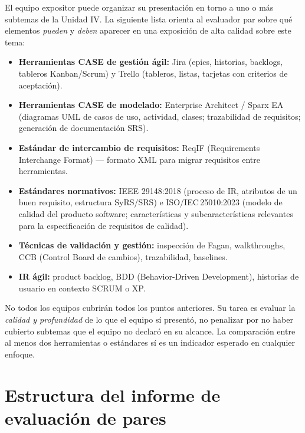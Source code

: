 \documentclass[11pt]{article}
\begin{document}
El equipo expositor puede organizar su presentación en torno a uno o más subtemas de la Unidad IV. La siguiente lista orienta al evaluador par sobre qué elementos \emph{pueden} y \emph{deben} aparecer en una exposición de alta calidad sobre este tema:

\begin{itemize}[leftmargin=16pt,itemsep=3pt]
	\item \textbf{Herramientas CASE de gestión ágil:} Jira (epics, historias, backlogs, tableros Kanban/Scrum) y Trello (tableros, listas, tarjetas con criterios de aceptación).
	\item \textbf{Herramientas CASE de modelado:} Enterprise Architect / Sparx EA (diagramas UML de casos de uso, actividad, clases; trazabilidad de requisitos; generación de documentación SRS).
	\item \textbf{Estándar de intercambio de requisitos:} ReqIF (Requirements Interchange Format) --- formato XML para migrar requisitos entre herramientas.
	\item \textbf{Estándares normativos:} IEEE 29148:2018 (proceso de IR, atributos de un buen requisito, estructura SyRS/SRS) e ISO/IEC\,25010:2023 (modelo de calidad del producto software; características y subcaracterísticas relevantes para la especificación de requisitos de calidad).
	\item \textbf{Técnicas de validación y gestión:} inspección de Fagan, walkthroughs, CCB (Control Board de cambios), trazabilidad, baselines.
	\item \textbf{IR ágil:} product backlog, BDD (Behavior-Driven Development), historias de usuario en contexto SCRUM o XP.
\end{itemize}

\begin{cajaaviso}[title=Para el evaluador par]
	No todos los equipos cubrirán todos los puntos anteriores. Su tarea es evaluar la \emph{calidad y profundidad} de lo que el equipo sí presentó, no penalizar por no haber cubierto subtemas que el equipo no declaró en su alcance. La comparación entre al menos dos herramientas o estándares sí es un indicador esperado en cualquier enfoque.
\end{cajaaviso}

\section{\textcolor{utegreendk}{Estructura del informe de evaluación de pares}}
\end{document}
